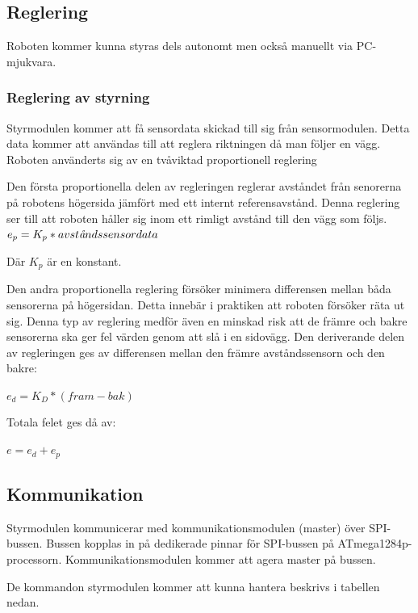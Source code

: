 \documentclass[a4paper,12pt,fleqn]{article}
\begin{document}

\subsection{Reglering}

Roboten kommer kunna styras dels autonomt men också manuellt via PC-mjukvara. 

\subsubsection{Reglering av styrning}
Styrmodulen kommer att få sensordata skickad till sig från sensormodulen. Detta data kommer att användas till att reglera riktningen då man följer en vägg. Roboten använderts sig av en tvåviktad proportionell reglering 

Den första proportionella delen av regleringen reglerar avståndet från senorerna på robotens högersida jämfört med ett internt referensavstånd. Denna reglering ser till att roboten håller sig inom ett rimligt avstånd till den vägg som följs.
$ e_p = K_{p}*avst\text{\it{å}}ndssensordata $

Där $K_{p}$ är en konstant.

Den andra proportionella reglering försöker minimera differensen mellan båda sensorerna på högersidan. Detta innebär i praktiken att  roboten försöker räta ut sig. Denna typ av reglering medför även en minskad risk att de främre och bakre sensorerna ska ger fel värden genom att slå i en sidovägg.
Den deriverande delen av regleringen ges av differensen mellan den främre avståndssensorn och den bakre: 

$ e_d = K_{D}*(fram - bak) $

Totala felet ges då av: 

$e = e_d + e_p$



\subsection{Kommunikation}

Styrmodulen kommunicerar med kommunikationsmodulen (master) över SPI-bussen. Bussen kopplas in på dedikerade pinnar för SPI-bussen på ATmega1284p-processorn. Kommunikationsmodulen kommer att agera master på bussen.

De kommandon styrmodulen kommer att kunna hantera beskrivs i tabellen nedan. \newline
\end{document}
